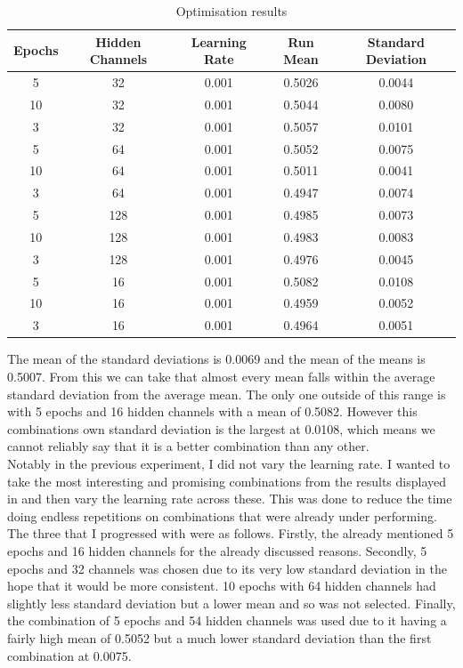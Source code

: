 \documentclass{l4proj}
\begin{document}
\begin{table}[h]
    \centering
    \caption{Optimisation results}
    \label{tab:Optimisation_results}
    \begin{tabular}{|c|c|c|c|c|}
        \hline
        \textbf{Epochs} & \textbf{Hidden Channels} & \textbf{Learning Rate} & \textbf{Run Mean} & \textbf{Standard Deviation} \\ \hline
        5 & 32 & 0.001 & 0.5026 & 0.0044 \\ \hline
        10 & 32 & 0.001 & 0.5044 & 0.0080 \\ \hline
        3 & 32 & 0.001 & 0.5057 & 0.0101 \\ \hline
        5 & 64 & 0.001 & 0.5052 & 0.0075 \\ \hline
        10 & 64 & 0.001 &0.5011 & 0.0041 \\ \hline
        3 & 64 & 0.001 & 0.4947 & 0.0074 \\ \hline
        5 & 128 & 0.001 & 0.4985 & 0.0073 \\ \hline
        10 & 128 & 0.001 & 0.4983 & 0.0083 \\ \hline
        3 & 128 & 0.001 & 0.4976 & 0.0045 \\ \hline
        5 & 16 & 0.001 & 0.5082 & 0.0108 \\ \hline
        10 & 16 & 0.001 & 0.4959 & 0.0052 \\ \hline
        3 & 16 & 0.001 & 0.4964 & 0.0051 \\ \hline
    \end{tabular}
\end{table}

The mean of the standard deviations is 0.0069 and the mean of the means is 0.5007. From this we can take that almost every mean falls within the average standard deviation from the average mean. The only one outside of this range is with 5 epochs and 16 hidden channels with a mean of 0.5082. However this combinations own standard deviation is the largest at 0.0108, which means we cannot reliably say that it is a better combination than any other.\\

Notably in the previous experiment, I did not vary the learning rate. I wanted to take the most interesting and promising combinations from the results displayed in  and then vary the learning rate across these. This was done to reduce the time doing endless repetitions on combinations that were already under performing. The three that I progressed with were as follows. Firstly, the already mentioned 5 epochs and 16 hidden channels for the already discussed reasons. Secondly, 5 epochs and 32 channels was chosen due to its very low standard deviation in the hope that it would be more consistent. 10 epochs with 64 hidden channels had slightly less standard deviation but a lower mean and so was not selected. Finally, the combination of 5 epochs and 54 hidden channels was used due to it having a fairly high mean of 0.5052 but a much lower standard deviation than the first combination at 0.0075. \\
\end{document}

